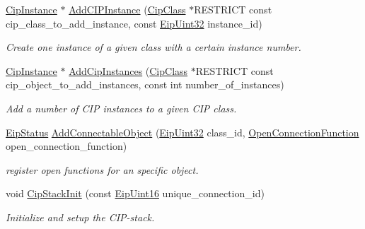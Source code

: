 \begin{DoxyCompactItemize}
\item 
\hyperlink{ciptypes_8h_aea7976be629e5ece275c993982186188}{\-Cip\-Instance} $\ast$ \hyperlink{group__CIP__API_ga180023c8528628f7d83023e4db81287a}{\-Add\-C\-I\-P\-Instance} (\hyperlink{ciptypes_8h_a175191808b8fac50b47d9bbc9edc6051}{\-Cip\-Class} $\ast$\-R\-E\-S\-T\-R\-I\-C\-T const cip\-\_\-class\-\_\-to\-\_\-add\-\_\-instance, const \hyperlink{typedefs_8h_abf2dd49262551294eb990ef8746a2767}{\-Eip\-Uint32} instance\-\_\-id)
\begin{DoxyCompactList}\small\item\em \-Create one instance of a given class with a certain instance number. \end{DoxyCompactList}\item 
\hyperlink{ciptypes_8h_aea7976be629e5ece275c993982186188}{\-Cip\-Instance} $\ast$ \hyperlink{group__CIP__API_ga39dafca98f844a12511af11b1273d0a8}{\-Add\-Cip\-Instances} (\hyperlink{ciptypes_8h_a175191808b8fac50b47d9bbc9edc6051}{\-Cip\-Class} $\ast$\-R\-E\-S\-T\-R\-I\-C\-T const cip\-\_\-object\-\_\-to\-\_\-add\-\_\-instances, const int number\-\_\-of\-\_\-instances)
\begin{DoxyCompactList}\small\item\em \-Add a number of \-C\-I\-P instances to a given \-C\-I\-P class. \end{DoxyCompactList}\item 
\hyperlink{typedefs_8h_a3dcc5f7837c120360f8cc88a76781709}{\-Eip\-Status} \hyperlink{group__CIP__API_gac7db4d2927e83b6b3110f5dc66589b1e}{\-Add\-Connectable\-Object} (\hyperlink{typedefs_8h_abf2dd49262551294eb990ef8746a2767}{\-Eip\-Uint32} class\-\_\-id, \hyperlink{group__CIP__API_gaba609aaaca108b8d1b24da1ccbd7b375}{\-Open\-Connection\-Function} open\-\_\-connection\-\_\-function)
\begin{DoxyCompactList}\small\item\em register open functions for an specific object. \end{DoxyCompactList}\item 
void \hyperlink{group__CIP__API_ga5d4979945d124e28668b264c3823db1c}{\-Cip\-Stack\-Init} (const \hyperlink{typedefs_8h_ac1b4cfa25b4f5def62f23b455dd395d8}{\-Eip\-Uint16} unique\-\_\-connection\-\_\-id)
\begin{DoxyCompactList}\small\item\em \-Initialize and setup the \-C\-I\-P-\/stack. \end{DoxyCompactList}\item 

\end{DoxyCompactItemize}
